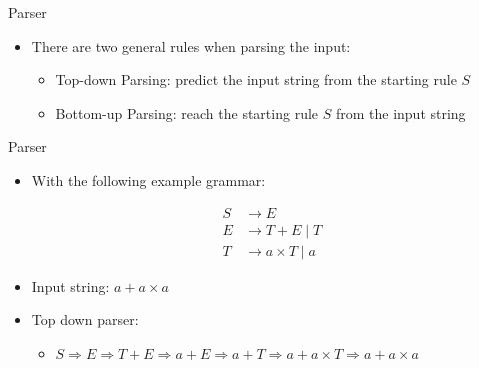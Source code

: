 
\begin{frame}{Parser}
\begin{itemize}
    \item There are two general rules when parsing the input:
    \begin{itemize}
        \item Top-down Parsing: predict the input string from the starting rule $S$
        \item Bottom-up Parsing: reach the starting rule $S$ from the input string
    \end{itemize}
\end{itemize}
\end{frame}


\begin{frame}{Parser}
\begin{itemize}
    \item With the following example grammar:
\begin{center}
\begin{align}
S &\rightarrow E \nonumber \\
E &\rightarrow T + E \; | \; T  \nonumber \\
T &\rightarrow a \times T \; | \; a \nonumber
\end{align}
\end{center}
    \item Input string: $a + a \times a$
    \item Top down parser:
    \begin{itemize}
        \item $ S \Rightarrow E \Rightarrow T + E \Rightarrow a + E \Rightarrow a + T \Rightarrow a + a \times T \Rightarrow a+ a \times a$
    \end{itemize}

\end{itemize}
\end{frame}


